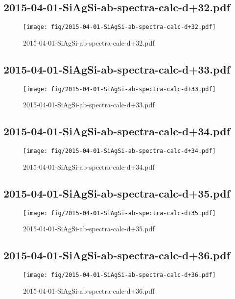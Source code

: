 \documentclass[fullscreen=true]{beamer}
\begin{document}
\subsection{2015-04-01-SiAgSi-ab-spectra-calc-d+32.pdf}
\begin{frame}
  \begin{figure}
    \texttt{[image: fig/2015-04-01-SiAgSi-ab-spectra-calc-d+32.pdf]}%
    \caption{2015-04-01-SiAgSi-ab-spectra-calc-d+32.pdf}
  \end{figure}
\end{frame}

\subsection{2015-04-01-SiAgSi-ab-spectra-calc-d+33.pdf}
\begin{frame}
  \begin{figure}
    \texttt{[image: fig/2015-04-01-SiAgSi-ab-spectra-calc-d+33.pdf]}%
    \caption{2015-04-01-SiAgSi-ab-spectra-calc-d+33.pdf}
  \end{figure}
\end{frame}

\subsection{2015-04-01-SiAgSi-ab-spectra-calc-d+34.pdf}
\begin{frame}
  \begin{figure}
    \texttt{[image: fig/2015-04-01-SiAgSi-ab-spectra-calc-d+34.pdf]}%
    \caption{2015-04-01-SiAgSi-ab-spectra-calc-d+34.pdf}
  \end{figure}
\end{frame}

\subsection{2015-04-01-SiAgSi-ab-spectra-calc-d+35.pdf}
\begin{frame}
  \begin{figure}
    \texttt{[image: fig/2015-04-01-SiAgSi-ab-spectra-calc-d+35.pdf]}%
    \caption{2015-04-01-SiAgSi-ab-spectra-calc-d+35.pdf}
  \end{figure}
\end{frame}

\subsection{2015-04-01-SiAgSi-ab-spectra-calc-d+36.pdf}
\begin{frame}
  \begin{figure}
    \texttt{[image: fig/2015-04-01-SiAgSi-ab-spectra-calc-d+36.pdf]}%
    \caption{2015-04-01-SiAgSi-ab-spectra-calc-d+36.pdf}
  \end{figure}
\end{frame}
\end{document}
